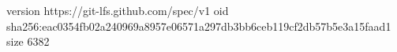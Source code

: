 version https://git-lfs.github.com/spec/v1
oid sha256:eac0354fb02a240969a8957e06571a297db3bb6ceb119cf2db57b5e3a15faad1
size 6382
